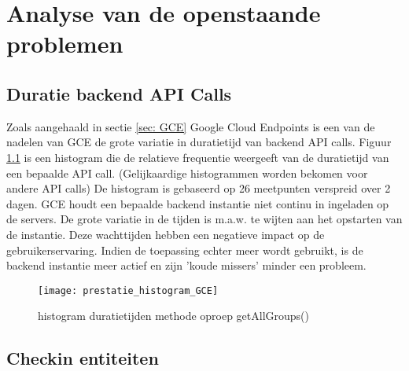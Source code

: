
\chapter{Analyse van de openstaande problemen}%

\section{Duratie backend API Calls}

Zoals aangehaald in sectie \ref{sec: GCE} Google Cloud Endpoints is een van de nadelen van GCE de grote variatie in duratietijd van backend API calls. Figuur \ref{fig:hist_getAllGroups} is een histogram die de relatieve frequentie weergeeft van de duratietijd van een bepaalde API call. (Gelijkaardige histogrammen worden bekomen voor andere API calls) De histogram is gebaseerd op 26 meetpunten verspreid over 2 dagen. GCE houdt een bepaalde backend instantie niet continu in ingeladen op de servers. De grote variatie in de tijden is m.a.w. te wijten aan het opstarten van de instantie. Deze wachttijden hebben een negatieve impact op de gebruikerservaring. Indien de toepassing echter meer wordt gebruikt, is de backend instantie meer actief en zijn 'koude missers' minder een probleem.
\begin{figure}[H]
	\centering
	\texttt{[image: prestatie\_histogram\_GCE]}
	\caption{histogram duratietijden methode oproep getAllGroups()}
	\label{fig:hist_getAllGroups}
\end{figure}


\section{Checkin entiteiten}

